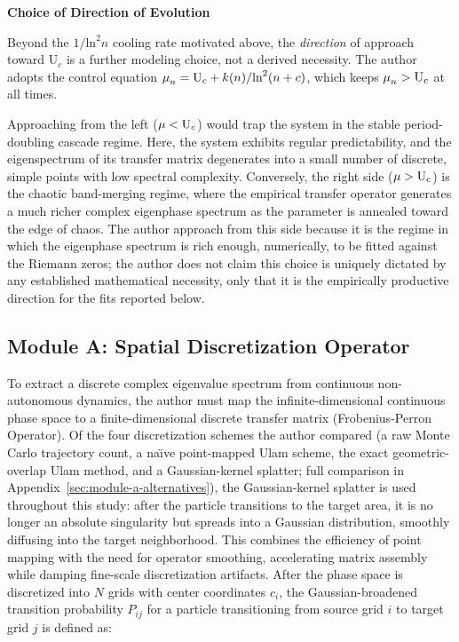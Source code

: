 \documentclass[mca,article,submit,oneauthor,pdftex]{Definitions/mdpi}
\begin{document}
\textbf{Choice of Direction of Evolution}

Beyond the \(\text{1/}\text{ln}^{\text{2}}{n}\) cooling rate motivated
above, the \emph{direction} of approach toward \(\text{U}_{{c}}\) is a
further modeling choice, not a derived necessity. The author adopts the control
equation
\(\text{\ensuremath{\mu}}_{{n}}=\text{U}_{{c}}+{k}{(}{n}{)/}\text{ln}^{\text{2}}(n+c\text{)}\),
which keeps \(\text{\ensuremath{\mu}}_{{n}}>\text{U}_{{c}}\) at all
times.

Approaching from the left (\(\text{\ensuremath{\mu}}<\text{U}_{c}\))
would trap the system in the stable period-doubling cascade regime.
Here, the system exhibits regular predictability, and the eigenspectrum
of its transfer matrix degenerates into a small number of discrete, simple
points with low spectral complexity. Conversely, the right side
(\(\text{\ensuremath{\mu}}>\text{U}_{{c}}\)) is the chaotic band-merging
regime, where the empirical transfer operator generates a much richer
complex eigenphase spectrum as the parameter is annealed toward the edge
of chaos. The author approach from this side because it is the regime in which the
eigenphase spectrum is rich enough, numerically, to be fitted against the
Riemann zeros; the author does not claim this choice is uniquely dictated by any
established mathematical necessity, only that it is the empirically
productive direction for the fits reported below.

\subsection{Module A: Spatial Discretization Operator}\label{sec:module-a}

To extract a discrete complex eigenvalue spectrum from continuous
non-autonomous dynamics, the author must map the infinite-dimensional continuous
phase space to a finite-dimensional discrete transfer matrix
(Frobenius-Perron Operator). Of the four discretization schemes the author
compared (a raw Monte Carlo trajectory count, a na\"\i{}ve point-mapped Ulam
scheme, the exact geometric-overlap Ulam method, and a Gaussian-kernel
splatter; full comparison in Appendix~\ref{sec:module-a-alternatives}), the
Gaussian-kernel splatter is used throughout this study: after the particle
transitions to the target area, it is no longer an absolute singularity but
spreads into a Gaussian distribution, smoothly diffusing into the target
neighborhood. This combines the efficiency of point mapping with the need
for operator smoothing, accelerating matrix assembly while damping
fine-scale discretization artifacts. After the phase space is discretized
into $N$ grids with center coordinates $c_i$, the Gaussian-broadened
transition probability $P_{ij}$ for a particle transitioning from source
grid $i$ to target grid $j$ is defined as:
\end{document}
